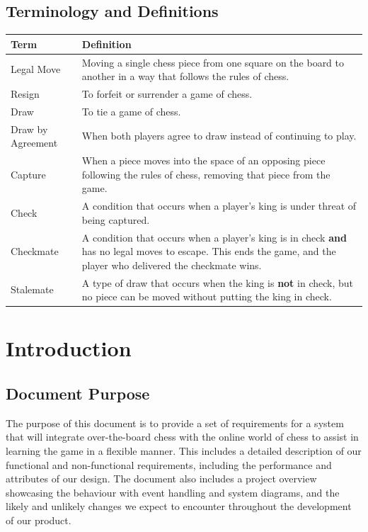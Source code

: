 \documentclass[12pt]{article}
\begin{document}
\subsection{Terminology and Definitions}
\begin{tabularx}{\linewidth}{ l X }
    \toprule		
    \textbf{Term} & \textbf{Definition}\\
    \midrule 
    Legal Move & Moving a single chess piece from one square on the board to another in a way that follows the rules of chess. \\[0.5cm]
    Resign & To forfeit or surrender a game of chess. \\[0.5cm]
    Draw & To tie a game of chess. \\[0.5cm]
    Draw by Agreement & When both players agree to draw instead of continuing to play. \\[0.5cm]
    Capture & When a piece moves into the space of an opposing piece following the rules of chess, removing that piece from the game. \\[0.5cm]
    Check & A condition that occurs when a player's king is under threat of being captured. \\[0.5cm]
    Checkmate & A condition that occurs when a player's king is in check \textbf{and} has no legal moves to escape. 
    This ends the game, and the player who delivered the checkmate wins. \\[0.5cm]
    Stalemate & A type of draw that occurs when the king is \textbf{not} in check, but no piece can be moved without putting the king in check. \\[0.5cm]
    \bottomrule
  \end{tabularx}

\section{Introduction}
\subsection{Document Purpose}
The purpose of this document is to provide a set of requirements for a system that will integrate over-the-board chess with the online world of chess to assist in learning the game in a flexible manner.
This includes a detailed description of our functional and non-functional requirements, including the performance and attributes of our design. 
The document also includes a project overview showcasing the behaviour with event handling and system diagrams, and the likely and unlikely changes we expect to 
encounter throughout the development of our product.
\end{document}
